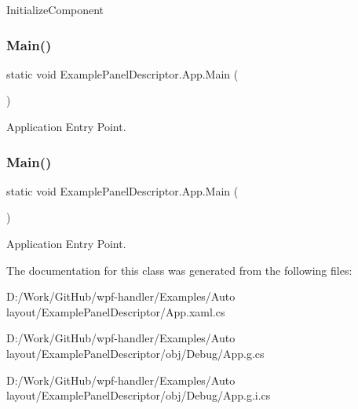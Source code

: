Initialize\+Component 

\mbox{\label{class_example_panel_descriptor_1_1_app_a979034e15f6742b0bc57da018b1a992d}} 
\subsubsection{\texorpdfstring{Main()}{Main()}\hspace{0.1cm}{\footnotesize\ttfamily [1/2]}}
{\footnotesize\ttfamily static void Example\+Panel\+Descriptor.\+App.\+Main (\begin{DoxyParamCaption}{ }\end{DoxyParamCaption})\hspace{0.3cm}{\ttfamily [static]}}



Application Entry Point. 

\mbox{\label{class_example_panel_descriptor_1_1_app_a979034e15f6742b0bc57da018b1a992d}} 
\subsubsection{\texorpdfstring{Main()}{Main()}\hspace{0.1cm}{\footnotesize\ttfamily [2/2]}}
{\footnotesize\ttfamily static void Example\+Panel\+Descriptor.\+App.\+Main (\begin{DoxyParamCaption}{ }\end{DoxyParamCaption})\hspace{0.3cm}{\ttfamily [static]}}



Application Entry Point. 



The documentation for this class was generated from the following files\+:\begin{DoxyCompactItemize}
\item 
D\+:/\+Work/\+Git\+Hub/wpf-\/handler/\+Examples/\+Auto layout/\+Example\+Panel\+Descriptor/App.\+xaml.\+cs\item 
D\+:/\+Work/\+Git\+Hub/wpf-\/handler/\+Examples/\+Auto layout/\+Example\+Panel\+Descriptor/obj/\+Debug/App.\+g.\+cs\item 
D\+:/\+Work/\+Git\+Hub/wpf-\/handler/\+Examples/\+Auto layout/\+Example\+Panel\+Descriptor/obj/\+Debug/App.\+g.\+i.\+cs\end{DoxyCompactItemize}
